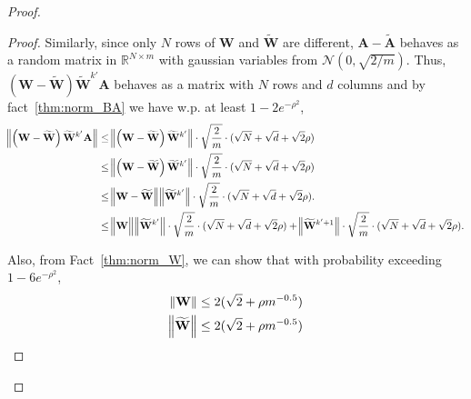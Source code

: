 \begin{claim}
\begin{proof}
\begin{proof}
					Similarly, since only $N$ rows of $\mathbf{W}$ and $\widetilde{\mathbf{W}}$ are different, $\mathbf{A} - \widetilde{\mathbf{A}}$ behaves as a random  matrix in $\mathbb{R}^{N \times m}$ with gaussian variables from $\mathcal{N}(0, \sqrt{2/m})$. Thus, $\left(\mathbf{W} - \widetilde{\mathbf{W}}\right)  \widetilde{\mathbf{W}}^{k'} \mathbf{A}$ behaves as a matrix with $N$ rows and $d$ columns and by fact~\ref{thm:norm_BA} we have w.p. at least $1 - 2e^{-\rho^2}$,
					\begin{align*}
						\norm[2]{\left(\mathbf{W} - \widetilde{\mathbf{W}}\right)  \widetilde{\mathbf{W}}^{k'} \mathbf{A}} &\le \norm[2]{\left(\mathbf{W} - \widetilde{\mathbf{W}}\right)  \widetilde{\mathbf{W}}^{k'}} \cdot \sqrt{\frac{2}{m}} \cdot (\sqrt{N} + \sqrt{d} + \sqrt{2}\rho) \\
						&\le \norm[2]{\left(\mathbf{W} - \widetilde{\mathbf{W}}\right)  \widetilde{\mathbf{W}}^{k'}} \cdot \sqrt{\frac{2}{m}} \cdot (\sqrt{N} + \sqrt{d} + \sqrt{2}\rho) \\
						&\le \norm[2]{\mathbf{W} - \widetilde{\mathbf{W}}} \norm[2]{\widetilde{\mathbf{W}}^{k'}}  \cdot \sqrt{\frac{2}{m}} \cdot (\sqrt{N} + \sqrt{d} + \sqrt{2}\rho). \\
						&\le \norm[2]{\mathbf{W}} \norm[2]{\widetilde{\mathbf{W}}^{k'}}  \cdot \sqrt{\frac{2}{m}} \cdot (\sqrt{N} + \sqrt{d} + \sqrt{2}\rho) + \norm[2]{\widetilde{\mathbf{W}}^{k' + 1}}  \cdot \sqrt{\frac{2}{m}} \cdot (\sqrt{N} + \sqrt{d} + \sqrt{2}\rho).
					\end{align*}
					
					Also, from Fact~\ref{thm:norm_W}, we can show that with probability exceeding $1 - 6e^{-\rho^2}$,
					\begin{align*}
						\norm{\mathbf{W}} &\le 2 (\sqrt{2} + \rho m^{-0.5})\\
						\norm[2]{\widetilde{\mathbf{W}}} &\le 2 (\sqrt{2} + \rho m^{-0.5})
					\end{align*}
					

\end{proof}
\end{proof}
\end{claim}
